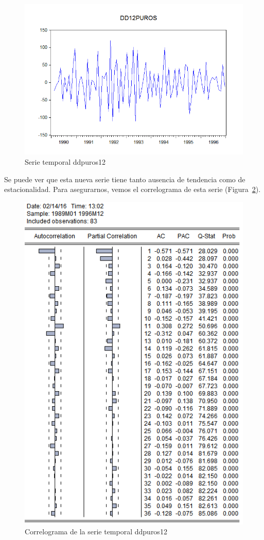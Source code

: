 \documentclass[12pt,a4paper,twoside,openright,titlepage,final]{article}
\begin{document}
\begin{figure}[tbph!]
	\centering
	\includegraphics[width=0.8\linewidth]{imagenes/puros/puros-diferenciada-estacional12.png}
	\caption{Serie temporal ddpuros12}
	\label{fig:puros-diferenciada-estacional12}
\end{figure}

Se puede ver que esta nueva serie tiene tanto ausencia de tendencia como de estacionalidad. Para asegurarnos, vemos el correlograma de esta serie (Figura~\ref{fig:correlograma-puros-diferenciada-estacional12}).\\

\begin{figure}[tbph!]
	\centering
	\includegraphics[width=0.8\linewidth]{imagenes/puros/correlograma-puros-diferenciada-estacional12.png}
	\caption{Correlograma de la serie temporal ddpuros12}
	\label{fig:correlograma-puros-diferenciada-estacional12}
\end{figure}
\end{document}
